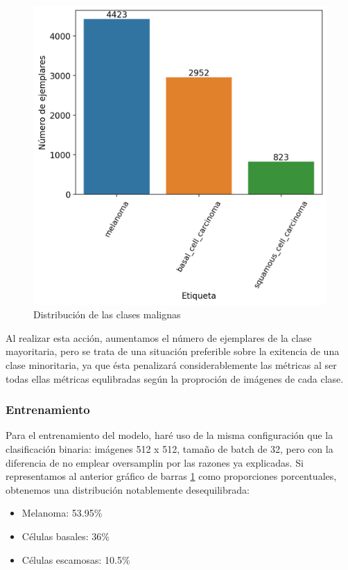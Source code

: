 \begin{figure}[H]
	\centering
	\includegraphics[scale = 0.6]{imagenes/countmalignant.png}
	\caption{Distribución de las clases malignas}
	\label {fig:malas}
\end{figure}


Al realizar esta acción, aumentamos el número de ejemplares de la clase mayoritaria, pero se trata de una situación preferible sobre la exitencia de una clase minoritaria, ya que ésta penalizará considerablemente las métricas al ser todas ellas métricas equlibradas según la proproción de imágenes de cada clase.

\subsubsection{Entrenamiento}

Para el entrenamiento del modelo, haré uso de la misma configuración que la clasificación binaria: imágenes 512 x 512, tamaño de batch de 32, pero con la diferencia de no emplear oversamplin por las razones ya explicadas. Si representamos al anterior gráfico de barras \ref{fig:malas} como proporciones porcentuales, obtenemos una distribución notablemente desequilibrada:

\begin{itemize}
	\item Melanoma: 53.95\%
	\item Células basales: 36\%
	\item Células escamosas: 10.5\%
 \end{itemize}
 
